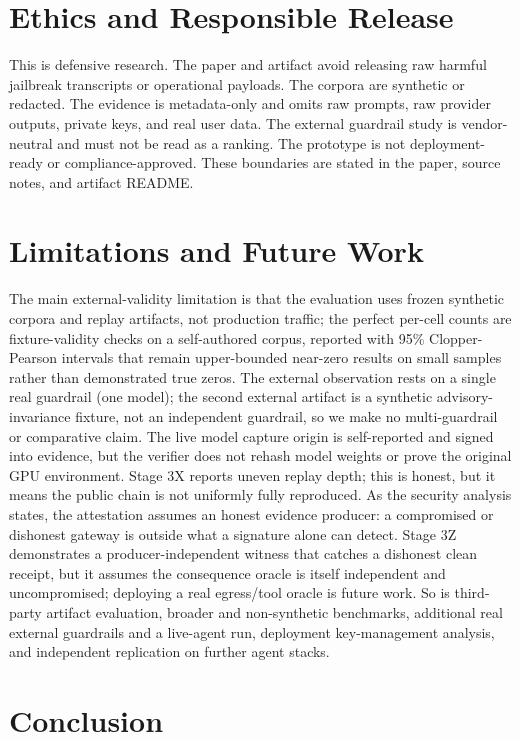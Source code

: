 \documentclass[sigconf,anonymous,review]{acmart}
\begin{document}
\section{Ethics and Responsible Release}

This is defensive research. The paper and artifact avoid releasing raw harmful jailbreak transcripts or operational payloads. The corpora are synthetic or redacted. The evidence is metadata-only and omits raw prompts, raw provider outputs, private keys, and real user data. The external guardrail study is vendor-neutral and must not be read as a ranking. The prototype is not deployment-ready or compliance-approved. These boundaries are stated in the paper, source notes, and artifact README.

\section{Limitations and Future Work}

The main external-validity limitation is that the evaluation uses frozen synthetic corpora and replay artifacts, not production traffic; the perfect per-cell counts are fixture-validity checks on a self-authored corpus, reported with 95\% Clopper-Pearson intervals that remain upper-bounded near-zero results on small samples rather than demonstrated true zeros. The external observation rests on a single real guardrail (one model); the second external artifact is a synthetic advisory-invariance fixture, not an independent guardrail, so we make no multi-guardrail or comparative claim. The live model capture origin is self-reported and signed into evidence, but the verifier does not rehash model weights or prove the original GPU environment. Stage 3X reports uneven replay depth; this is honest, but it means the public chain is not uniformly fully reproduced. As the security analysis states, the attestation assumes an honest evidence producer: a compromised or dishonest gateway is outside what a signature alone can detect. Stage 3Z demonstrates a producer-independent witness that catches a dishonest clean receipt, but it assumes the consequence oracle is itself independent and uncompromised; deploying a real egress/tool oracle is future work. So is third-party artifact evaluation, broader and non-synthetic benchmarks, additional real external guardrails and a live-agent run, deployment key-management analysis, and independent replication on further agent stacks.

\section{Conclusion}
\end{document}
